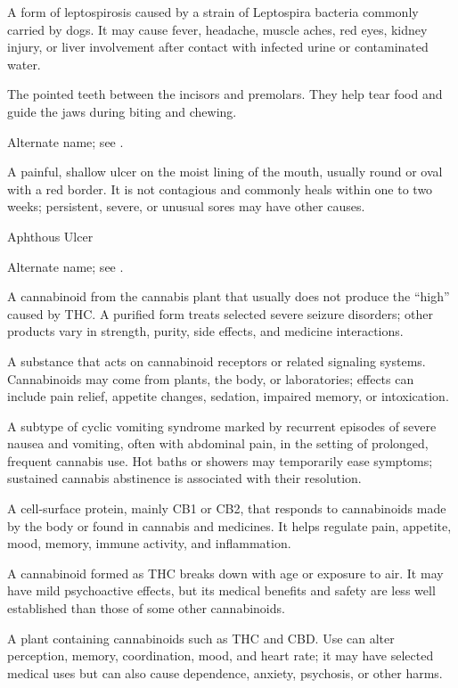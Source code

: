  A form of leptospirosis caused by a strain of Leptospira bacteria commonly carried by dogs. It may cause fever, headache, muscle aches, red eyes, kidney injury, or liver involvement after contact with infected urine or contaminated water.

 The pointed teeth between the incisors and premolars. They help tear food and guide the jaws during biting and chewing.

 Alternate name; see .

 A painful, shallow ulcer on the moist lining of the mouth, usually round or oval with a red border. It is not contagious and commonly heals within one to two weeks; persistent, severe, or unusual sores may have other causes.

\synonyms
Aphthous Ulcer

 Alternate name; see .

 A cannabinoid from the cannabis plant that usually does not produce the “high” caused by THC. A purified form treats selected severe seizure disorders; other products vary in strength, purity, side effects, and medicine interactions.

 A substance that acts on cannabinoid receptors or related signaling systems. Cannabinoids may come from plants, the body, or laboratories; effects can include pain relief, appetite changes, sedation, impaired memory, or intoxication.

 A subtype of cyclic vomiting syndrome marked by recurrent episodes of severe nausea and vomiting, often with abdominal pain, in the setting of prolonged, frequent cannabis use. Hot baths or showers may temporarily ease symptoms; sustained cannabis abstinence is associated with their resolution.

 A cell-surface protein, mainly CB1 or CB2, that responds to cannabinoids made by the body or found in cannabis and medicines. It helps regulate pain, appetite, mood, memory, immune activity, and inflammation.

 A cannabinoid formed as THC breaks down with age or exposure to air. It may have mild psychoactive effects, but its medical benefits and safety are less well established than those of some other cannabinoids.

 A plant containing cannabinoids such as THC and CBD. Use can alter perception, memory, coordination, mood, and heart rate; it may have selected medical uses but can also cause dependence, anxiety, psychosis, or other harms.

